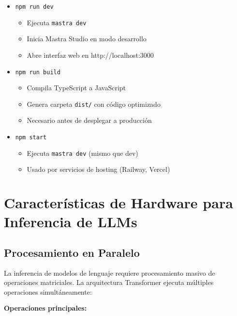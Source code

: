 \documentclass[12pt,a4paper]{article}
\begin{document}
\begin{itemize}
    \item \texttt{npm run dev}
    \begin{itemize}
        \item Ejecuta \texttt{mastra dev}
        \item Inicia Mastra Studio en modo desarrollo
        \item Abre interfaz web en http://localhost:3000
    \end{itemize}

    \item \texttt{npm run build}
    \begin{itemize}
        \item Compila TypeScript a JavaScript
        \item Genera carpeta \texttt{dist/} con código optimizado
        \item Necesario antes de desplegar a producción
    \end{itemize}

    \item \texttt{npm start}
    \begin{itemize}
        \item Ejecuta \texttt{mastra dev} (mismo que dev)
        \item Usado por servicios de hosting (Railway, Vercel)
    \end{itemize}
\end{itemize}

\newpage

\section{Características de Hardware para Inferencia de LLMs}

\subsection{Procesamiento en Paralelo}

La inferencia de modelos de lenguaje requiere procesamiento masivo de operaciones matriciales. La arquitectura Transformer ejecuta múltiples operaciones simultáneamente:

\textbf{Operaciones principales:}
\end{document}
